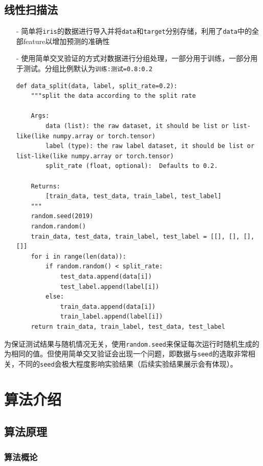 \documentclass[utf-8]{article}
\begin{document}
\subsection{线性扫描法}
\begin{itemize}
	\item [-]	简单将\verb|iris|的数据进行导入并将\verb|data|和\verb|target|分别存储，利用了\verb|data|中的全部feature以增加预测的准确性
	\item [-]	使用简单交叉验证的方式对数据进行分组处理，一部分用于训练，一部分用于测试。分组比例默认为\verb|训练:测试=0.8:0.2|
	\begin{lstlisting}[style = python]
def data_split(data, label, split_rate=0.2):
	"""split the data according to the split rate

	Args:
		data (list): the raw dataset, it should be list or list-like(like numpy.array or torch.tensor)
		label (type): the raw label dataset, it should be list or list-like(like numpy.array or torch.tensor)
		split_rate (float, optional):  Defaults to 0.2.

	Returns:
		[train_data, test_data, train_label, test_label]
	"""
	random.seed(2019)
	random.random()
	train_data, test_data, train_label, test_label = [[], [], [], []]
	for i in range(len(data)):
		if random.random() < split_rate:
			test_data.append(data[i])
			test_label.append(label[i])
		else:
			train_data.append(data[i])
			train_label.append(label[i])
	return train_data, train_label, test_data, test_label
	\end{lstlisting}
\end{itemize}
\begin{warn}[Notice:]
为保证测试结果与随机情况无关，使用\verb|random.seed|来保证每次运行时随机生成的为相同的值。但使用简单交叉验证会出现一个问题，即数据与\verb|seed|的选取非常相关，不同的\verb|seed|会极大程度影响实验结果（后续实验结果展示会有体现）。
\end{warn}

\section{算法介绍}

\subsection{算法原理}

\subsubsection{算法概论}
\end{document}
